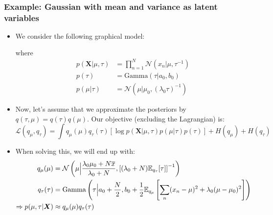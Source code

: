 \subsubsection{Example: Gaussian with mean and variance as latent variables}
\begin{itemize}
	\item We consider the following graphical model:\\
	\begin{figure}[ht!]
		\centering
	\end{figure}

	where
	\begin{equation*}
		\begin{split}
			p(\bm{X}|\mu, \tau) & = \prod_{n=1}^{N} \mathcal{N}(x_n|\mu, \tau^{-1})\\
			p(\tau) & = \text{Gamma}(\tau|a_0, b_0)\\
			p(\mu|\tau) & = \mathcal{N}(\mu|\mu_0, (\lambda_0 \tau)^{-1})
		\end{split}
	\end{equation*}
	\item Now, let's assume that we approximate the posteriors by $q(\tau, \mu)=q(\tau)q(\mu)$. Our objective (excluding the Lagrangian) is:
	$$\mathcal{L}(q_{\mu}, q_{\tau}) = \int q_{\mu}(\mu)q_{\tau}(\tau)\left[\log p(\bm{X}|\mu, \tau)p(\mu|\tau)p(\tau)\right] + H(q_{\mu}) + H(q_{\tau})$$
	\item When solving this, we will end up with:
	\begin{equation*}
		\begin{split}
			q_{\mu}(\mu) & = \mathcal{N}\left(\mu\Big\vert \frac{\lambda_0\mu_0 + N\overline{x}}{\lambda_0 + N}, \left[(\lambda_0 + N)\mathbb{E}_{q_{\tau}}[\tau]\right]^{-1}\right)\\
			q_{\tau}(\tau) & = \text{Gamma}\left(\tau\Big\vert a_0 + \frac{N}{2}, b_0 + \frac{1}{2}\mathbb{E}_{q_{\mu}}\left[\sum_n (x_n-\mu)^2+\lambda_0(\mu-\mu_0)^2\right]\right)\\
			\Rightarrow p(\mu, \tau|\bm{X}) &\approx q_{\mu}(\mu)q_{\tau}(\tau)
		\end{split}
	\end{equation*}
\end{itemize}
